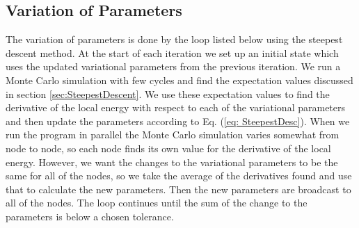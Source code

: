 \documentclass[../main.tex]{subfiles}
\begin{document}
\subsection{Variation of Parameters}

The variation of parameters is done by the loop listed below using the steepest descent method. At the start of each iteration we set up an initial state which uses the updated variational parameters from the previous iteration. We run a Monte Carlo simulation with few cycles and find the expectation values discussed in section \ref{sec:SteepestDescent}. We use these expectation values to find the derivative of the local energy with respect to each of the variational parameters and then update the parameters according to Eq. (\ref{eq: SteepestDesc}). When we run the program in parallel the Monte Carlo simulation varies somewhat from node to node, so each node finds its own value for the derivative of the local energy. However, we want the changes to the variational parameters to be the same for all of the nodes, so we take the average of the derivatives found and use that to calculate the new parameters. Then the new parameters are broadcast to all of the nodes. The loop continues until the sum of the change to the parameters is below a chosen tolerance.
\end{document}
